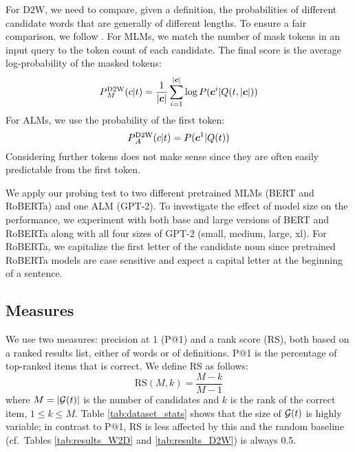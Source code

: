 \documentclass[11pt,a4paper]{article}
\def\uprm#1#2{\mbox{$_#2^{\hbox{\scriptsize #1}}$}}
\begin{document}
For D2W, we need to compare, given a definition, the probabilities of
different candidate words that are generally of different lengths.
To ensure a fair comparison,
we follow
. For MLMs, we
match the number of mask tokens in an input query to the
token count of each candidate. The final score is the average log-probability of the masked tokens:
\begin{equation*}
    P\uprm{D2W}{M}(c|t) =
    \frac{1}{|\bm{c}|}\sum_{i=1}^{|\bm{c}|}\log P(\bm{c}^i |
    Q(t,|\bm{c}|))
\end{equation*}
For ALMs, we use the probability of
the first token:
\begin{equation*}
    P\uprm{D2W}{A}(c|t) =
     P(\bm{c}^1 |
    Q(t))
\end{equation*}
Considering further tokens does not make sense since they
are often easily predictable from the first token.


We apply our probing test to two different pretrained
MLMs (BERT and
RoBERTa) and one ALM
(GPT-2). 
To investigate the effect of model
size on the performance, we experiment with both
base and large versions of BERT and RoBERTa
along with all four sizes of GPT-2 (small, medium,
large, xl). 
For RoBERTa, we capitalize the first letter of the candidate
noun  since pretrained RoBERTa models are case sensitive
and expect a capital letter at the beginning of a
sentence.


\subsection{Measures}
We use two measures: precision at 1 (P@1) and a rank score
(RS), both based on a ranked results list, either of words
or of definitions. P@1 is the percentage of top-ranked items
that is correct.
We define RS as follows:  
\begin{equation*}
    \text{RS}(M,k) = \frac{M-k}{M-1}
\end{equation*}
where $M=|{\cal G}(t)|$ is the number of candidates  and
$k$ is the rank of the correct item, $1 \leq k \leq M$.
Table \ref{tab:dataset_stats} shows that the size of ${\cal G}(t)$
is highly variable;
in contrast to P@1, RS is less affected by
this and the random baseline (cf.\ Tables
\ref{tab:results_W2D}
and \ref{tab:results_D2W}) is always 0.5.  
\end{document}
